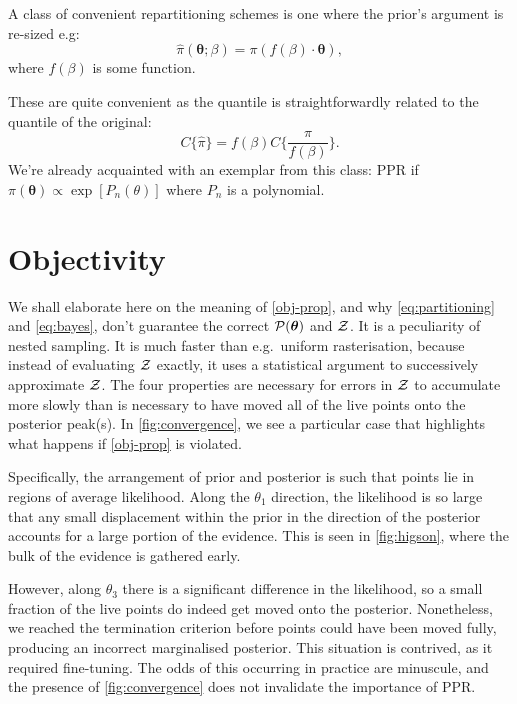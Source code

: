 \documentclass[usenatbib]{mnras}
\begin{document}
A class of convenient repartitioning schemes is one where the prior's
argument is re-sized e.g:
\begin{equation}
  \label{eq:argument-resize}
  \hat{\pi} (\bm{\theta}; \beta) = \pi (f(\beta)\cdot\bm{\theta}),
\end{equation}
where \(f(\beta)\) is some function.

These are quite convenient as the quantile is straightforwardly
related to the quantile of the original:
\begin{equation}
  \label{eq:quantile-stuff}
  C\{\hat{\pi}\} = f(\beta) C\{\frac{\pi}{f(\beta)}\}.
\end{equation}
We're already acquainted with an exemplar from this class: PPR if
\( \pi (\bm{\theta}) \propto \exp [P_{n}(\theta)]\) where $P_{n}$ is a
polynomial.


\section{Objectivity\label{sec:objectivity}}
We shall elaborate here on the meaning of \cref{obj-prop}, and why
\cref{eq:partitioning} and \cref{eq:bayes}, don't guarantee the
correct \( {\cal P}(\bm{\theta})\) and ${\cal Z}$.  It is a
peculiarity of nested sampling. It is much faster than e.g.~uniform
rasterisation, because instead of evaluating ${\cal Z}$ exactly, it
uses a statistical argument to successively approximate ${\cal
  Z}$. The four properties are necessary for errors in ${\cal Z}$ to
accumulate more slowly than is necessary to have moved all of the live
points onto the posterior peak(s). In \cref{fig:convergence}, we see a
particular case that highlights what happens if \cref{obj-prop} is
violated.

Specifically, the arrangement of prior and posterior is such that
points lie in regions of average likelihood. Along the $\theta_{1}$
direction, the likelihood is so large that any small displacement
within the prior in the direction of the posterior accounts for a
large portion of the evidence. This is seen in \cref{fig:higson},
where the bulk of the evidence is gathered early.

However, along $\theta_{3}$ there is a significant difference in the
likelihood, so a small fraction of the live points do indeed get moved
onto the posterior. Nonetheless, we reached the termination criterion
before points could have been moved fully, producing an incorrect
marginalised posterior.  This situation is contrived, as it required
fine-tuning. The odds of this occurring in practice are minuscule, and
the presence of \cref{fig:convergence} does not invalidate the
importance of PPR.
\end{document}
